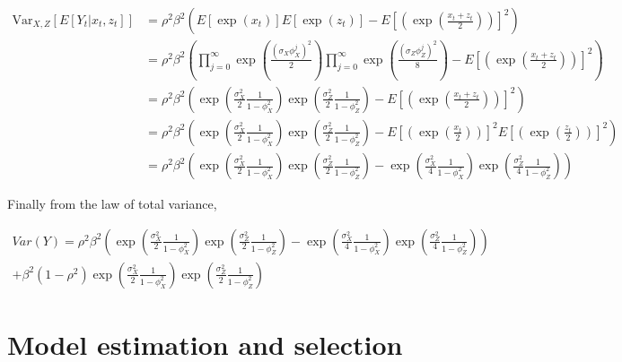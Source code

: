 \documentclass[11pt,a4,twosided,singlespacing,titlepagenumber=on]{scrreprt}
\numberwithin{equation}{chapter} %
\theoremstyle{remark}
\begin{document}
\begin{align*}
\text{Var}_{X,Z} \left[ E[Y_t | x_t, z_t] \right] &= \rho^2 \beta^2 \left( E [ \exp (x_t) ] E [ \exp (z_t) ] - E \left[ \left( \exp \left(\frac{x_t + z_t}{2}\right) \right) \right]^2\right) \\
                                                  &= \rho^2 \beta^2 \left( \prod_{j=0}^\infty \exp \left(\frac{(\sigma_X\phi_X^j)^2}{2} \right) \prod_{j=0}^\infty \exp \left(\frac{(\sigma_Z\phi_Z^j)^2}{8} \right) - E \left[ \left( \exp \left(\frac{x_t + z_t}{2}\right) \right) \right]^2\right) \\
                                                  &= \rho^2 \beta^2 \left( \exp \left( \frac{\sigma_X^2}{2} \frac{1}{1-\phi_X^{2}} \right) \exp \left( \frac{\sigma_Z^2}{2} \frac{1}{1-\phi_Z^{2}} \right) - E \left[ \left( \exp \left(\frac{x_t + z_t}{2}\right) \right) \right]^2\right) \\
                                                  &= \rho^2 \beta^2 \left( \exp \left( \frac{\sigma_X^2}{2} \frac{1}{1-\phi_X^{2}} \right) \exp \left( \frac{\sigma_Z^2}{2} \frac{1}{1-\phi_Z^{2}} \right) - E \left[ \left( \exp \left(\frac{x_t}{2}\right) \right)\right]^2 E \left[ \left( \exp \left(\frac{z_t}{2}\right) \right)\right]^2\right) \\
                                                  &= \rho^2 \beta^2 \left( \exp \left( \frac{\sigma_X^2}{2} \frac{1}{1-\phi_X^{2}} \right) \exp \left( \frac{\sigma_Z^2}{2} \frac{1}{1-\phi_Z^{2}} \right) - \exp \left( \frac{\sigma_X^2}{4} \frac{1}{1-\phi_X^{2}} \right) \exp \left( \frac{\sigma_Z^2}{4} \frac{1}{1-\phi_Z^{2}}\right) \right)
\end{align*}

Finally from the law of total variance,

\begin{multline}
Var(Y) = \rho^2 \beta^2 \left( \exp \left( \frac{\sigma_X^2}{2} \frac{1}{1-\phi_X^{2}} \right) \exp \left( \frac{\sigma_Z^2}{2} \frac{1}{1-\phi_Z^{2}} \right) - \exp \left( \frac{\sigma_X^2}{4} \frac{1}{1-\phi_X^{2}} \right) \exp \left( \frac{\sigma_Z^2}{4} \frac{1}{1-\phi_Z^{2}}\right) \right) \\ + \beta^2 (1-\rho^2) \exp \left( \frac{\sigma_X^2}{2} \frac{1}{1-\phi_X^{2}}\right) \exp \left( \frac{\sigma_Z^2}{2} \frac{1}{1-\phi_Z^{2}}\right)
\end{multline}

\chapter{Model estimation and selection}
\end{document}
